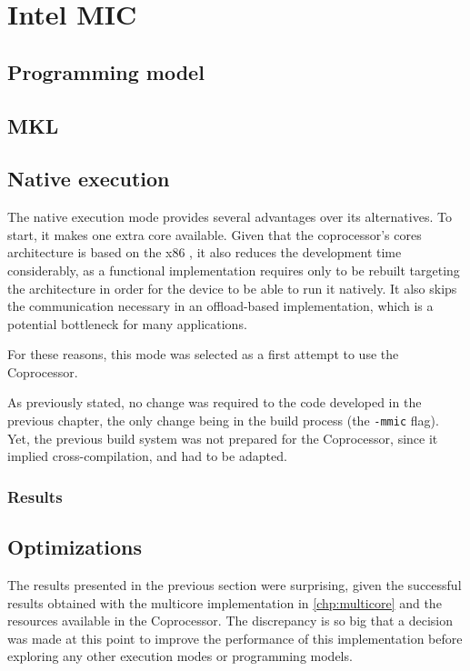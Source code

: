 \documentclass[../thesis]{subfiles}
\begin{document}
	\chapter{Intel MIC}
	\label{chp:mic}

	
	

	\section{Programming model}
	\section{MKL}

	\section{Native execution}
	The native execution mode provides several advantages over its alternatives. To start, it makes one extra core available. Given that the coprocessor's cores architecture is based on the x86 \isa, it also reduces the development time considerably, as a \cpu functional implementation requires only to be rebuilt targeting the \mic architecture in order for the device to be able to run it natively. It also skips the communication necessary in an offload-based implementation, which is a potential bottleneck for many applications.

	For these reasons, this mode was selected as a first attempt to use the \intel\xeonphi Coprocessor.

	As previously stated, no change was required to the code developed in the previous chapter, the only change being in the build process (the \texttt{-mmic} flag). Yet, the previous build system was not prepared for the \intel\xeonphi Coprocessor, since it implied cross-compilation, and had to be adapted.

	\subsection{Results}

	\section{Optimizations}
	\label{sec:mic:optims}
		The results presented in the previous section were surprising, given the successful results obtained with the multicore implementation in \cref{chp:multicore} and the resources available in the \intel\xeonphi Coprocessor. The discrepancy is so big that a decision was made at this point to improve the performance of this implementation before exploring any other execution modes or programming models.
\end{document}
